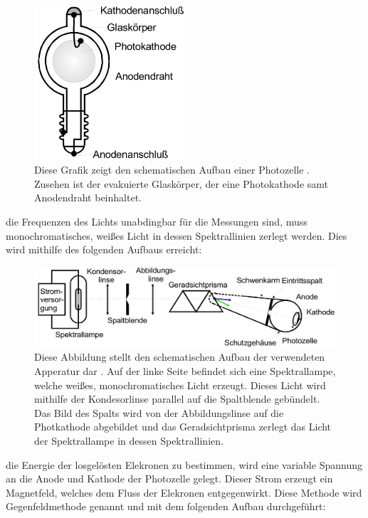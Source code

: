     \begin{figure}[H]
        \centering
        \includegraphics[width=0.5\textwidth]{images/Photozelle.jpg}
        \caption{Diese Grafik zeigt den schematischen Aufbau einer Photozelle \cite{V500}. Zusehen ist der evakuierte Glaskörper, der eine Photokathode samt Anodendraht beinhaltet.}
        \label{fig:1}
    \end{figure}
    \justifying die Frequenzen des Lichts unabdingbar für die Messungen sind, muss monochromatisches, weißes Licht in dessen Spektrallinien zerlegt werden. Dies wird mithilfe des folgenden 
    Aufbaus erreicht:
    \begin{figure}[H]
        \centering
        \includegraphics[width=\textwidth]{images/Schema.jpg}
        \caption{Diese Abbildung stellt den schematischen Aufbau der verwendeten Apperatur dar \cite{V500}. Auf der linke Seite befindet sich eine Spektrallampe, welche weißes, monochromatisches
        Licht erzeugt. Dieses Licht wird mithilfe der Kondesorlinse parallel auf die Spaltblende gebündelt. Das Bild des Spalts wird von der Abbildungslinse auf die Photkathode 
        abgebildet und das Geradsichtprisma zerlegt das Licht der Spektrallampe in dessen Spektrallinien.}
        \label{fig:2}
    \end{figure}
    \justifying die Energie der losgelösten Elekronen zu bestimmen, wird eine variable Spannung an die Anode und Kathode der Photozelle gelegt. Dieser Strom erzeugt ein Magnetfeld, welches 
    dem Fluss der Elekronen entgegenwirkt. Diese Methode wird Gegenfeldmethode genannt und mit dem folgenden Aufbau durchgeführt:
